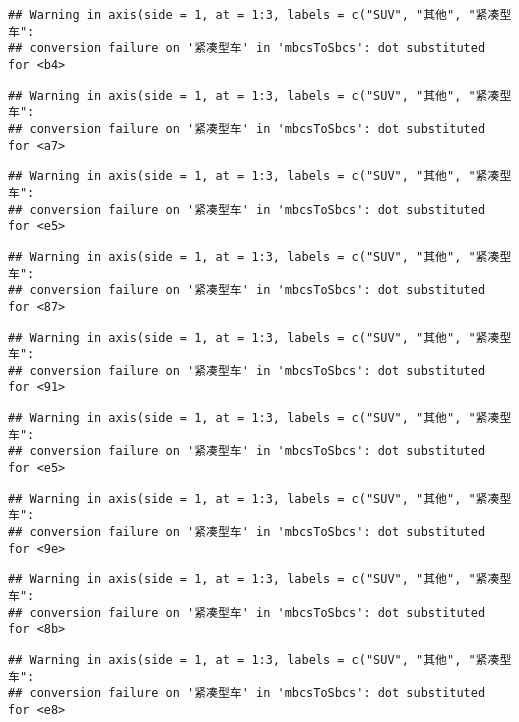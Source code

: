 \documentclass[]{article}
\begin{document}
\begin{verbatim}
## Warning in axis(side = 1, at = 1:3, labels = c("SUV", "其他", "紧凑型车":
## conversion failure on '紧凑型车' in 'mbcsToSbcs': dot substituted for <b4>
\end{verbatim}

\begin{verbatim}
## Warning in axis(side = 1, at = 1:3, labels = c("SUV", "其他", "紧凑型车":
## conversion failure on '紧凑型车' in 'mbcsToSbcs': dot substituted for <a7>
\end{verbatim}

\begin{verbatim}
## Warning in axis(side = 1, at = 1:3, labels = c("SUV", "其他", "紧凑型车":
## conversion failure on '紧凑型车' in 'mbcsToSbcs': dot substituted for <e5>
\end{verbatim}

\begin{verbatim}
## Warning in axis(side = 1, at = 1:3, labels = c("SUV", "其他", "紧凑型车":
## conversion failure on '紧凑型车' in 'mbcsToSbcs': dot substituted for <87>
\end{verbatim}

\begin{verbatim}
## Warning in axis(side = 1, at = 1:3, labels = c("SUV", "其他", "紧凑型车":
## conversion failure on '紧凑型车' in 'mbcsToSbcs': dot substituted for <91>
\end{verbatim}

\begin{verbatim}
## Warning in axis(side = 1, at = 1:3, labels = c("SUV", "其他", "紧凑型车":
## conversion failure on '紧凑型车' in 'mbcsToSbcs': dot substituted for <e5>
\end{verbatim}

\begin{verbatim}
## Warning in axis(side = 1, at = 1:3, labels = c("SUV", "其他", "紧凑型车":
## conversion failure on '紧凑型车' in 'mbcsToSbcs': dot substituted for <9e>
\end{verbatim}

\begin{verbatim}
## Warning in axis(side = 1, at = 1:3, labels = c("SUV", "其他", "紧凑型车":
## conversion failure on '紧凑型车' in 'mbcsToSbcs': dot substituted for <8b>
\end{verbatim}

\begin{verbatim}
## Warning in axis(side = 1, at = 1:3, labels = c("SUV", "其他", "紧凑型车":
## conversion failure on '紧凑型车' in 'mbcsToSbcs': dot substituted for <e8>
\end{verbatim}
\end{document}
